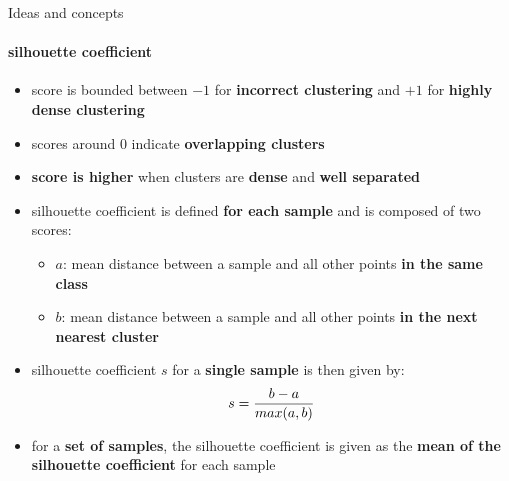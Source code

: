 \documentclass[aspectratio=169, professionalfonts]{beamer}
\begin{document}
\begin{frame}{Ideas and concepts}
    \framesubtitle{silhouette coefficient}
	\begin{itemize}
	    \setlength\itemsep{0em}
	    \item score is bounded between $-1$ for \textbf{incorrect clustering} and $+1$ for \textbf{highly dense clustering}
	    \item scores around $0$ indicate \textbf{overlapping clusters}
	    \item \textbf{score is higher} when clusters are \textbf{dense} and \textbf{well separated}
	    \item silhouette coefficient is defined \textbf{for each sample} and is composed of two scores:
        \begin{itemize}
            \setlength\itemsep{0em}
            \item $a$: mean distance between a sample and all other points \textbf{in the same class}
            \item $b$: mean distance between a sample and all other points \textbf{in the next nearest cluster}
        \end{itemize}
        \item silhouette coefficient $s$ for a \textbf{single sample} is then given by:
        \begin{equation}
            \centering
            s = \frac{b - a}{max(a, b)}
            \label{eq:Silhouette-Coefficient}
        \end{equation}
        \item for a \textbf{set of samples}, the silhouette coefficient is given as the \textbf{mean of the silhouette coefficient} for each sample
    \end{itemize}
\end{frame}
\end{document}
